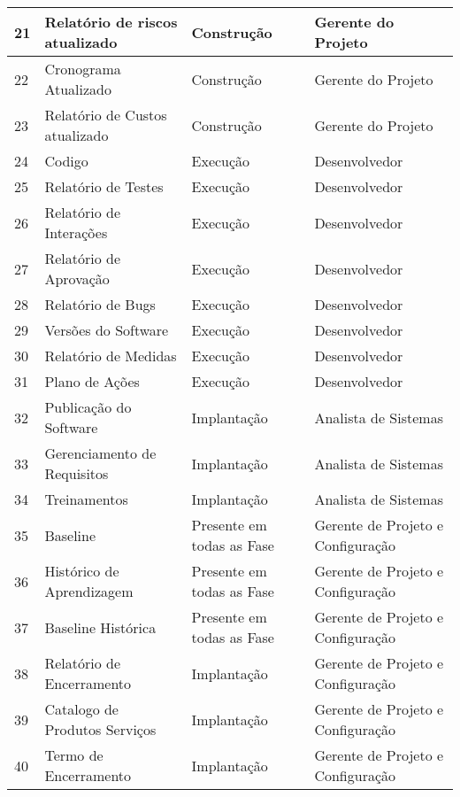 \begin{table}[h!]
\begin{tabular}{|l|l|l|l|}
21 & Relatório de riscos atualizado & Construção & Gerente do Projeto \\ \hline
22 & Cronograma Atualizado & Construção & Gerente do Projeto \\ \hline
23 & Relatório de Custos atualizado & Construção & Gerente do Projeto \\ \hline
24 & Codigo & Execução & Desenvolvedor \\ \hline
25 & Relatório de Testes & Execução & Desenvolvedor \\ \hline
26 & Relatório de Interações & Execução & Desenvolvedor \\ \hline
27 & Relatório de Aprovação & Execução & Desenvolvedor \\ \hline
28 & Relatório de Bugs & Execução & Desenvolvedor \\ \hline
29 & Versões do Software & Execução & Desenvolvedor \\ \hline
30 & Relatório de Medidas & Execução & Desenvolvedor \\ \hline
31 & Plano de Ações & Execução & Desenvolvedor \\ \hline
32 & Publicação do Software & Implantação & Analista de Sistemas \\ \hline
33 & Gerenciamento de Requisitos & Implantação & Analista de Sistemas \\ \hline
34 & Treinamentos & Implantação & Analista de Sistemas \\ \hline
35 & Baseline & Presente em todas as Fase & Gerente de Projeto e Configuração \\ \hline
36 & Histórico de Aprendizagem & Presente em todas as Fase & Gerente de Projeto e Configuração \\ \hline
37 & Baseline Histórica & Presente em todas as Fase & Gerente de Projeto e Configuração \\ \hline
38 & Relatório de Encerramento & Implantação & Gerente de Projeto e Configuração \\ \hline
39 & Catalogo de Produtos Serviços & Implantação & Gerente de Projeto e Configuração \\ \hline
40 & Termo de Encerramento & Implantação & Gerente de Projeto e Configuração \\ \hline
\end{tabular}
\end{table}